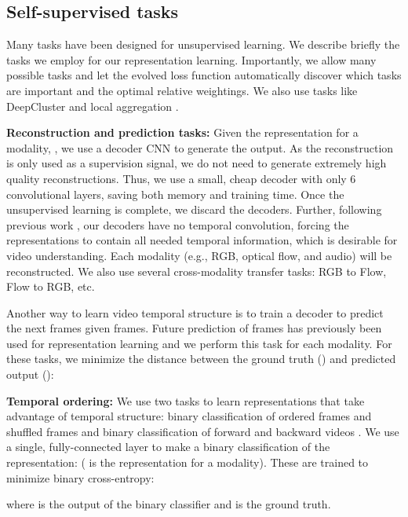 \documentclass[10pt,twocolumn,letterpaper]{article}
\begin{document}
\subsection{Self-supervised tasks}
\label{subsec:tasks}

Many tasks have been designed for unsupervised learning. We describe briefly the tasks we employ for our representation learning. Importantly, we allow many possible tasks and let the evolved loss function automatically discover which tasks are important and the optimal relative weightings. We also use tasks like DeepCluster \cite{caron2018deep} and local aggregation \cite{zhuang2019local}.



\textbf{Reconstruction and prediction tasks:} Given the representation for a modality, , we use a decoder CNN to generate the output. As the reconstruction is only used as a supervision signal, we do not need to generate extremely high quality reconstructions. Thus, we use a small, cheap decoder with only 6 convolutional layers, saving both memory and training time. Once the unsupervised learning is complete, we discard the decoders. Further, following previous work \cite{stroud2018d3d}, our decoders have no temporal convolution, forcing the representations to contain all needed temporal information, which is desirable for video understanding.
Each modality (e.g., RGB, optical flow, and audio) will be reconstructed. We also use several cross-modality transfer tasks: RGB to Flow, Flow to RGB, etc. 

Another way to learn video temporal structure is to train a decoder to predict the next  frames given  frames. Future prediction of frames has previously been used for representation learning \cite{srivastava2015unsupervised} and we perform this task for each modality.
For these tasks, we minimize the  distance between the ground truth () and predicted output ():



\textbf{Temporal ordering:} We use two tasks to learn representations that take advantage of temporal structure: binary classification of ordered frames and shuffled frames \cite{misra2016shuffle} and binary classification of forward and backward videos \cite{pickup2014seeing}. We use a single, fully-connected layer to make a binary classification of the representation:  ( is the representation for a modality).
These are trained to minimize binary cross-entropy:

where  is the output of the binary classifier and  is the ground truth.
\end{document}
